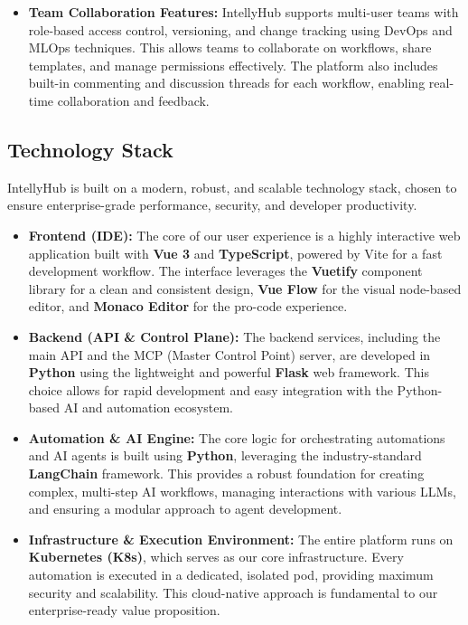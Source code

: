 \begin{itemize}
    \item \textbf{Team Collaboration Features:} IntellyHub supports multi-user teams with role-based access control, versioning, and change tracking using DevOps and MLOps techniques. This allows teams to collaborate on workflows, share templates, and manage permissions effectively. The platform also includes built-in commenting and discussion threads for each workflow, enabling real-time collaboration and feedback.
\end{itemize}

\pagebreak
\subsection{Technology Stack}
IntellyHub is built on a modern, robust, and scalable technology stack, chosen to ensure enterprise-grade performance, security, and developer productivity.

\begin{itemize}
\item \textbf{Frontend (IDE):} The core of our user experience is a highly interactive web application built with \textbf{Vue 3} and \textbf{TypeScript}, powered by Vite for a fast development workflow. The interface leverages the \textbf{Vuetify} component library for a clean and consistent design, \textbf{Vue Flow} for the visual node-based editor, and \textbf{Monaco Editor} for the pro-code experience.

\item \textbf{Backend (API \& Control Plane):} The backend services, including the main API and the MCP (Master Control Point) server, are developed in \textbf{Python} using the lightweight and powerful \textbf{Flask} web framework. This choice allows for rapid development and easy integration with the Python-based AI and automation ecosystem.

\item \textbf{Automation \& AI Engine:} The core logic for orchestrating automations and AI agents is built using \textbf{Python}, leveraging the industry-standard \textbf{LangChain} framework. This provides a robust foundation for creating complex, multi-step AI workflows, managing interactions with various LLMs, and ensuring a modular approach to agent development.

\item \textbf{Infrastructure \& Execution Environment:} The entire platform runs on \textbf{Kubernetes (K8s)}, which serves as our core infrastructure. Every automation is executed in a dedicated, isolated pod, providing maximum security and scalability. This cloud-native approach is fundamental to our enterprise-ready value proposition.
\end{itemize}

